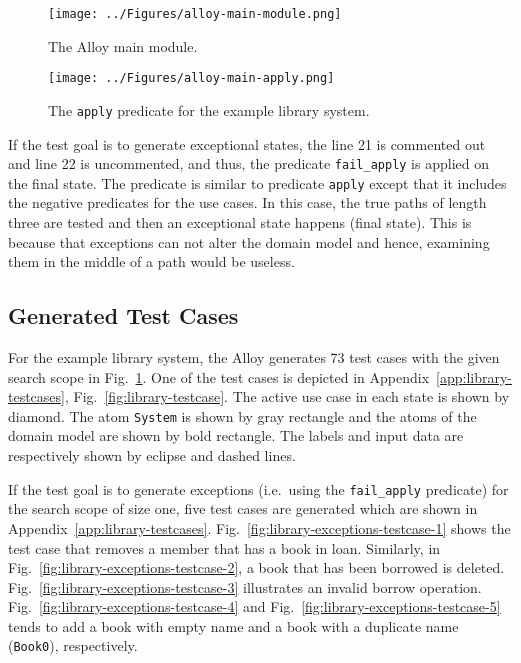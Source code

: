 \begin{figure}[h]
\centering
\texttt{[image: ../Figures/alloy-main-module.png]}
\caption{The Alloy main module.}
\label{fig:alloy-main-module}
\end{figure}

\begin{figure}[h]
\centering
\texttt{[image: ../Figures/alloy-main-apply.png]}
\caption{The \texttt{apply} predicate for the example library system.}
\label{fig:lalloy-main-apply}
\end{figure}

If the test goal is to generate exceptional states, the line 21 is commented out and line 22 is uncommented, and thus, the predicate \texttt{fail\_apply} is applied on the final state. The predicate is similar to predicate \texttt{apply} except that it includes the negative predicates for the use cases. In this case, the true paths of length three are tested and then an exceptional state happens (final state). This is because that exceptions can not alter the domain model and hence, examining them in the middle of a path would be useless.

\subsection{Generated Test Cases}
\label{sec:alloy-test-cases}
For the example library system, the Alloy generates 73 test cases with the given search scope in Fig.~\ref{fig:alloy-main-module}. One of the test cases is depicted in Appendix~\ref{app:library-testcases}, Fig.~\ref{fig:library-testcase}. The active use case in each state is shown by diamond. The atom \texttt{System} is shown by gray rectangle and the atoms of the domain model are shown by bold rectangle. The labels and input data are respectively shown by eclipse and dashed lines.

If the test goal is to generate exceptions (i.e.\ using the \texttt{fail\_apply} predicate) for the search scope of size one, five test cases are generated which are shown in Appendix~\ref{app:library-testcases}. Fig.~\ref{fig:library-exceptions-testcase-1} shows the test case that removes a member that has a book in loan. Similarly, in Fig.~\ref{fig:library-exceptions-testcase-2}, a book that has been borrowed is deleted. Fig.~\ref{fig:library-exceptions-testcase-3} illustrates an invalid borrow operation. Fig.~\ref{fig:library-exceptions-testcase-4} and Fig.~\ref{fig:library-exceptions-testcase-5} tends to add a book with empty name and a book with a duplicate name (\texttt{Book0}), respectively.